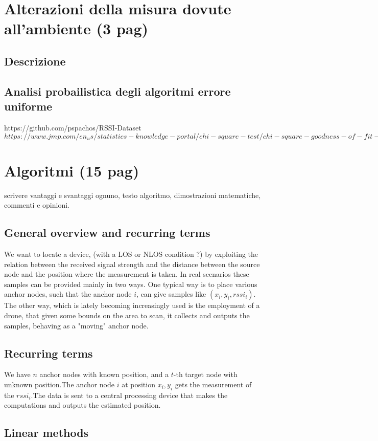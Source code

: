 \documentclass[12pt]{article}
\begin{document}
\section{Alterazioni della misura dovute all'ambiente (3 pag)}
\subsection{Descrizione}
\subsection{Analisi probailistica degli algoritmi errore uniforme}
https://github.com/pspachos/RSSI-Dataset\\
$https://www.jmp.com/en_us/statistics-knowledge-portal/chi-square-test/chi-square-goodness-of-fit-test.html$

\clearpage



\section{Algoritmi (15 pag)}
scrivere vantaggi e svantaggi ognuno, testo algoritmo, dimostrazioni matematiche, commenti e opinioni.
\subsection{General overview and recurring terms}
We want to locate a device, (with a LOS or NLOS condition ?) by exploiting the relation between the received signal strength and the distance between the source node and the position where the measurement is taken. In real scenarios these samples can be provided mainly in two ways. One typical way is to place various anchor nodes, such that the anchor node $i$, can give samples like $(x_i,y_i,rssi_i)$. The other way, which is lately becoming increasingly used is the employment of a drone, that given some bounds on the area to scan, it collects and outputs the samples, behaving as a "moving" anchor node.
\subsection{Recurring terms}
We have $n$ anchor nodes with known position, and a $t$-th target node with unknown position.The anchor node $i$ at position $x_i,y_i$ gets the measurement of the $rssi_i$.The data is sent to a central processing device that makes the computations and outputs the estimated position. 

\subsection{Linear methods}
\end{document}
